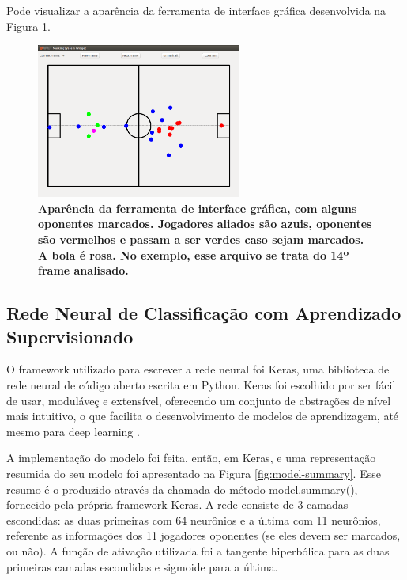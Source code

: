 \documentclass[10pt,fleqn,a4paper]{article}
\begin{document}
Pode visualizar a aparência da ferramenta de interface gráfica desenvolvida na Figura \ref{fig:exemplo-interface}.

\begin{figure}
\centering
\includegraphics[width=0.6\textwidth]{figures/exemplo-interface.png}
\caption{\textbf{Aparência da ferramenta de interface gráfica, com alguns oponentes marcados. Jogadores aliados são azuis, oponentes são vermelhos e passam a ser verdes caso sejam marcados. A bola é rosa. No exemplo, esse arquivo se trata do 14º frame analisado.}} \label{fig:exemplo-interface}
\end{figure}
    
    \subsection{Rede Neural de Classificação com Aprendizado Supervisionado}
    
    O framework utilizado para escrever a rede neural foi Keras, uma biblioteca de rede neural de código aberto escrita em Python. Keras foi escolhido por ser fácil de usar, moduláveç e extensível, oferecendo um conjunto de abstrações de nível mais intuitivo, o que facilita o desenvolvimento de modelos de aprendizagem, até mesmo para deep learning \citep{whykeras}.
    
    A implementação do modelo foi feita, então, em Keras, e uma representação resumida do seu modelo foi apresentado na Figura \ref{fig:model-summary}. Esse resumo é o produzido através da chamada do método model.summary(), fornecido pela própria framework Keras. A rede consiste de 3 camadas escondidas: as duas primeiras com 64 neurônios e a última com 11 neurônios, referente as informações dos 11 jogadores oponentes (se eles devem ser marcados, ou não). A função de ativação utilizada foi a tangente hiperbólica para as duas primeiras camadas escondidas e sigmoide para a última.
    
\end{document}
